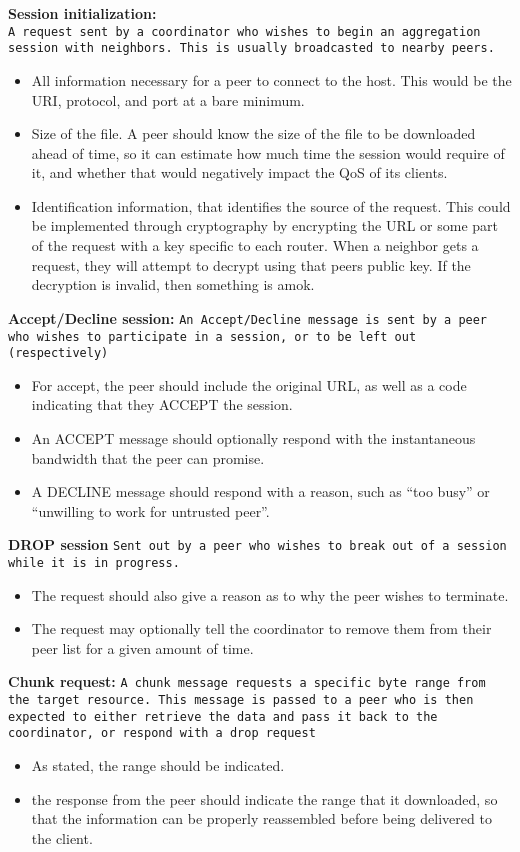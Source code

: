\documentclass[12pt]{article}
\begin{document}
		\textbf{Session initialization:}\\
		\texttt{A request sent by a coordinator who wishes to begin an aggregation session with neighbors. This is usually broadcasted to nearby peers.}				
		\begin{itemize}
			\item All information necessary for a peer to connect to the host. This would be the URI, protocol, and port at a bare minimum.
			\item Size of the file. A peer should know the size of the file to be downloaded ahead of time, so it can estimate how much time the session would require of it, and whether that would negatively impact the QoS of its clients.
			\item Identification information, that identifies the source of the request. This could be implemented through cryptography by encrypting the URL or some part of the request with a key specific to each router. When a neighbor gets a request, they will attempt to decrypt using that peers public key. If the decryption is invalid, then something is amok.
		\end{itemize}

		\textbf{Accept/Decline session:}
		\texttt{An Accept/Decline message is sent by a peer who wishes to participate in a session, or to be left out (respectively)}
		\begin{itemize}
			\item For accept, the peer should include the original URL, as well as a code indicating that they ACCEPT the session.
			\item An ACCEPT message should optionally respond with the instantaneous bandwidth that the peer can promise.
			\item A DECLINE message should respond with a reason, such as ``too busy'' or ``unwilling to work for untrusted peer''.
		\end{itemize}

		\textbf{DROP session}
		\texttt{Sent out by a peer who wishes to break out of a session while it is in progress.}
		\begin{itemize}
			\item The request should also give a reason as to why the peer wishes to terminate.
			\item The request may optionally tell the coordinator to remove them from their peer list for a given amount of time.
		\end{itemize}
		
		\textbf{Chunk request:}
		\texttt{A chunk message requests a specific byte range from the target resource. This message is passed to a peer who is then expected to either retrieve the data and pass it back to the coordinator, or respond with a drop request}
		\begin{itemize}
			\item As stated, the range should be indicated.
			\item the response from the peer should indicate the range that it downloaded, so that the information can be properly reassembled before being delivered to the client.
		\end{itemize} 
\end{document}
